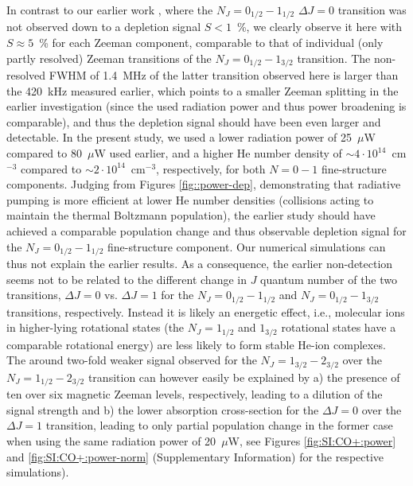 In contrast to our earlier work \cite{Brunken2017}, where the $N_J=0_{1/2}-1_{1/2}$ $\Delta J=0$ transition was not observed down to a depletion signal $S<1$~\%, we clearly observe it here with $S\approx 5$~\% for each Zeeman component, comparable to that of individual (only partly resolved) Zeeman transitions of the $N_J=0_{1/2}-1_{3/2}$ transition. The non-resolved FWHM of 1.4~MHz of the latter transition observed here is larger than the 420~kHz measured earlier, which points to a smaller Zeeman splitting in the earlier investigation (since the used radiation power and thus power broadening is comparable), and thus the depletion signal should have been even larger and detectable. In the present study, we used a lower radiation power of 25~$\mu$W compared to 80~$\mu$W used earlier, and a higher He number density of $\sim 4\cdot 10^{14}$~cm$^{-3}$ compared to $\sim 2\cdot 10^{14}$~cm$^{-3}$, respectively, for both $N=0-1$ fine-structure components. Judging from Figures \ref{fig::power-dep}, demonstrating that radiative pumping is more efficient at lower He number densities (collisions acting to maintain the thermal Boltzmann population), the earlier study should have achieved a comparable population change and thus observable depletion signal for the $N_J=0_{1/2}-1_{1/2}$ fine-structure component. Our numerical simulations can thus not explain the earlier results.
As a consequence, the earlier non-detection seems not to be related to the different change in $J$ quantum number of the two transitions, $\Delta J=0$ vs. $\Delta J=1$ for the $N_J=0_{1/2}-1_{1/2}$ and $N_J=0_{1/2}-1_{3/2}$ transitions, respectively. Instead it is likely an energetic effect, i.e., molecular ions in higher-lying rotational states (the $N_J=1_{1/2}$ and $1_{3/2}$ rotational states have a comparable rotational energy) are less likely to form stable He-ion complexes. \\

The around two-fold weaker signal observed for the $N_J=1_{3/2}-2_{3/2}$ over the $N_J=1_{1/2}-2_{3/2}$ transition can however easily be explained by a) the presence of ten over six magnetic Zeeman levels, respectively, leading to a dilution of the signal strength and b) the lower absorption cross-section for the $\Delta J=0$ over the $\Delta J=1$ transition, leading to only partial population change in the former case when using the same radiation power of 20~$\mu$W, see Figures \ref{fig:SI:CO+:power} and \ref{fig:SI:CO+:power-norm} (Supplementary Information) for the respective simulations). \\

